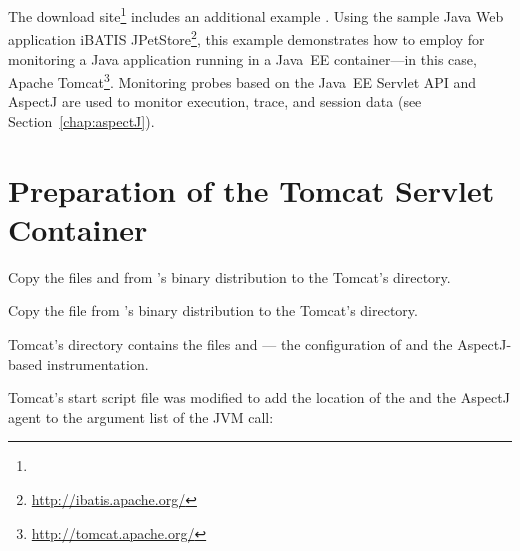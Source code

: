 The \Kieker{} download site\footnote{\KiekerDownloadURL{}} includes an additional %
example \file{\JavaEEServletExampleName}. Using the sample Java Web application %
iBATIS JPetStore\footnote{\url{http://ibatis.apache.org/}}, this example %
demonstrates how to employ \KiekerMonitoringPart{} for monitoring a Java application %
running in a Java~EE container---in this case, Apache Tomcat\footnote{\url{http://tomcat.apache.org/}}. %
Monitoring probes based on the Java~EE Servlet API %
and AspectJ are used to monitor execution, trace, and session data (see Section~\ref{chap:aspectJ}).

\section{Preparation of the Tomcat Servlet Container}


\begin{compactenum}
\item Copy the files \file{\mainJar} and \file{\aspectJWeaverJar} from %
\Kieker{}'s binary distribution to the Tomcat's  directory.
\item Copy the file \file{\servletWar} from \Kieker{}'s %
binary distribution to the Tomcat's  directory.
\item Tomcat's  directory contains the files  %
and  --- the configuration of \KiekerMonitoringPart{} and the %
AspectJ-based instrumentation. %
\item
 Tomcat's start script  file was modified to add the location %
of the  and the AspectJ agent to the argument %
list of the JVM call:
\end{compactenum}

\enlargethispage{1cm}

% 
% 
% 


